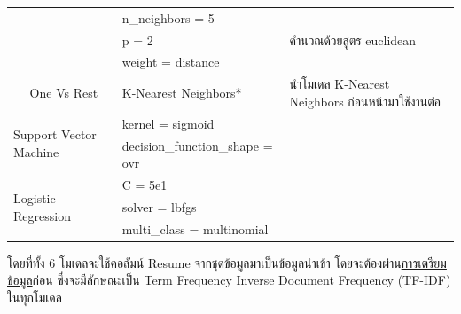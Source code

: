 \begin{table}[H]
\begin{tabularx}{\textwidth}{|l|l|X|X|}
                                                                     &                                 & n\_neighbors = 5         &                                    \\ \cline{3-4}
                                                                     &                                 & p = 2                    & คำนวณด้วยสูตร euclidean               \\ \cline{3-4}
                                                                     &                                 & weight = distance        &                                    \\  \cline{2-4}
                                                                     & One Vs Rest                     & K-Nearest Neighbors*             & นำโมเดล K-Nearest Neighbors ก่อนหน้ามาใช้งานต่อ \\ \hline
        \multicolumn{2}{|l|}{\multirow{2}{*}{Support Vector Machine}} & kernel = sigmoid                &                                                               \\ \cline{3-4}
        \multicolumn{2}{|l|}{}                                        & decision\_function\_shape = ovr &                                                               \\ \hline
        \multicolumn{2}{|l|}{\multirow{3}{*}{Logistic Regression}}    & C = 5e1                         &                                                               \\ \cline{3-4}
        \multicolumn{2}{|l|}{}                                        & solver = lbfgs                  &                                                               \\ \cline{3-4}
        \multicolumn{2}{|l|}{}                                        & multi\_class = multinomial      &                                                               \\ \hline
    \end{tabularx}
\end{table}

โดยที่ทั้ง 6 โมเดลจะใช้คอลัมน์ Resume จากชุดข้อมูลมาเป็นข้อมูลนำเข้า โดยจะต้องผ่าน\hyperref[subsec:Data Preparation]{การเตรียมข้อมูล}ก่อน ซึ่งจะมีลักษณะเป็น
Term Frequency Inverse Document Frequency (TF-IDF) ในทุกโมเดล

